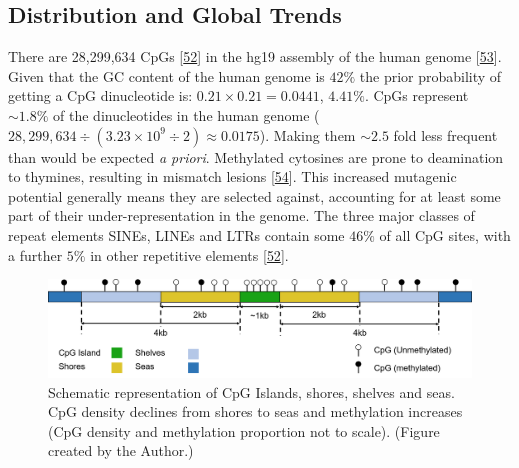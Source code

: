 \documentclass[
]{book}
\begin{document}
\hypertarget{IntroCpGdist}{%
\subsection{Distribution and Global Trends}\label{IntroCpGdist}}

There are 28,299,634 CpGs {[}\protect\hyperlink{ref-Luo2014}{52}{]} in the hg19 assembly of the human genome {[}\protect\hyperlink{ref-Lander2001}{53}{]}.
Given that the GC content of the human genome is \(42\%\) the prior probability of getting a CpG dinucleotide is: \(0.21 \times 0.21 = 0.0441\), \(4.41\%\).
CpGs represent \(\sim1.8\%\) of the dinucleotides in the human genome ( \(28,299,634 \div (3.23\times10^9\div2) \approx 0.0175\)).
Making them \(\sim2.5\) fold less frequent than would be expected \emph{a priori}.
Methylated cytosines are prone to deamination to thymines, resulting in mismatch lesions {[}\protect\hyperlink{ref-Duncan1980}{54}{]}.
This increased mutagenic potential generally means they are selected against, accounting for at least some part of their under-representation in the genome.
The three major classes of repeat elements SINEs, LINEs and LTRs contain some \(46\%\) of all CpG sites, with a further \(5\%\) in other repetitive elements {[}\protect\hyperlink{ref-Luo2014}{52}{]}.

\begin{figure}

{\centering \includegraphics[width=0.8\linewidth]{figs/CGI-Shores-Shelves-Seas_2} 

}

\caption{Schematic representation of CpG Islands, shores, shelves and seas. CpG density declines from shores to seas and methylation increases (CpG density and methylation proportion not to scale). (Figure created by the Author.)}\label{fig:CGIs}
\end{figure}
\end{document}
